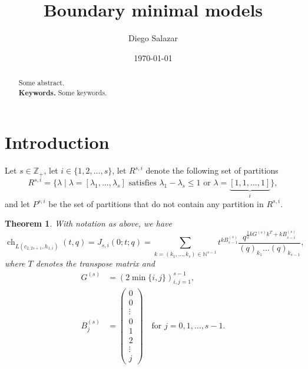 \documentclass[a4paper, 12pt, reqno]{amsart}
\newtheorem{theorem}{Theorem}[section]
\theoremstyle{remark}
\DeclareMathOperator{\ch}{ch}
\begin{document}
\setcounter{section}{-1}

\begin{abstract}
  Some abstract. \\
  \smallskip
  \noindent \textbf{Keywords.} Some keywords.
\end{abstract}

\title{Boundary minimal models}
\author{Diego Salazar}
\address{Instituto de Matemática Pura e Aplicada, Rio de Janeiro, RJ, Brazil}
\date{\today}
\maketitle

\section{Introduction}
\label{sec:introduction}

Let $s \in \mathbb{Z}_+$, let $i \in \{1, 2, \dots, s\}$, let $R^{s, i}$ denote the following set of partitions
\begin{equation*}
  R^{s, i} = \{\lambda \mid \text{$\lambda = [\lambda_1, \dots, \lambda_s]$ satisfies $\lambda_1 - \lambda_s \le 1$ or $\lambda = \underbrace{[1, 1, \dots, 1]}_i$}\},
\end{equation*}
and let $P^{s, i}$ be the set of partitions that do not contain any partition in $R^{s, i}$.

\begin{theorem}
  \label{thr:1}
  With notation as above, we have
  \begin{equation}
    \label{eq:2}
    \ch_{L(c_{2, 2s + 1}, h_{1, i})}(t, q) = J_{s, i}(0; t; q) = \sum_{k = (k_1, \dots, k_s) \in \mathbb{N}^{s - 1}}t^{kB^{(s)}_{s - 1}}\frac{q^{\frac{1}{2}kG^{(s)}k^T + kB^{(s)}_{s - i}}}{(q)_{k_1}\dots(q)_{k_{s - 1}}},
  \end{equation}
  where $T$ denotes the transpose matrix and
  \begin{align*}
    G^{(s)} &= (2\min\{i, j\})_{i, j = 1}^{s - 1}, \\
    B^{(s)}_j &=
                \left(\begin{smallmatrix}
                  0 \\
                  0 \\
                  \vdots \\
                  0 \\
                  1 \\
                  2 \\
                  \vdots \\
                  j
                \end{smallmatrix}\right) \quad \text{for $j = 0, 1, \dots, s - 1$}.  
  \end{align*}
\end{theorem}
\end{document}
